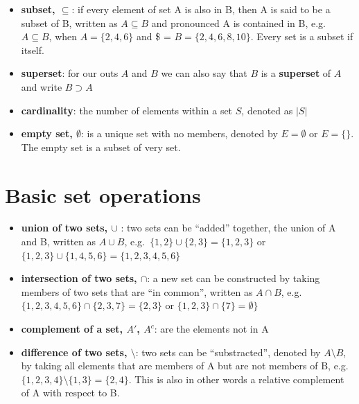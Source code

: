 \documentclass[
]{book}
\providecommand{\tightlist}{%
  \setlength{\itemsep}{0pt}\setlength{\parskip}{0pt}}
\theoremstyle{definition}
\theoremstyle{definition}
\theoremstyle{definition}
\theoremstyle{remark}
\begin{document}
\begin{itemize}
\tightlist
\item
  \textbf{subset, \(\subseteq\)}: if every element of set A is also in B, then A is said to be a subset of B, written as \(A \subseteq B\) and pronounced A is contained in B, e.g.~\(A \subseteq B\), when \(A = \{2, 4, 6\}\) and \$ = \(B = \{2, 4, 6, 8, 10\}\). Every set is a subset if itself.
\item
  \textbf{superset}: for our outs \(A\) and \(B\) we can also say that \(B\) is a \textbf{superset} of \(A\) and write \(B \supset A\)
\end{itemize}

\begin{itemize}
\tightlist
\item
  \textbf{cardinality}: the number of elements within a set \(S\), denoted as \(|S|\)
\item
  \textbf{empty set, \(\emptyset\)}: is a unique set with no members, denoted by \(E = \emptyset\) or \(E = \{\}\). The empty set is a subset of very set.
\end{itemize}

\hypertarget{basic-set-operations}{%
\section{Basic set operations}\label{basic-set-operations}}

\begin{itemize}
\tightlist
\item
  \textbf{union of two sets, \(\cup\) }: two sets can be ``added'' together, the union of A and B, written as \(A \cup B\), e.g.~\(\{1, 2\} \cup \{2, 3\} = \{1, 2, 3\}\) or \(\{1, 2, 3\} \cup \{1, 4, 5, 6\} = \{1, 2, 3, 4, 5, 6\}\)
\item
  \textbf{intersection of two sets, \(\cap\)}: a new set can be constructed by taking members of two sets that are ``in common'', written as \(A \cap B\), e.g.~\(\{1, 2, 3, 4, 5, 6\} \cap \{2, 3, 7\} = \{2, 3\}\) or \(\{1, 2, 3\} \cap \{7 \} = \emptyset \}\)
\end{itemize}

\begin{itemize}
\tightlist
\item
  \textbf{complement of a set, \(A'\), \(A^c\)}: are the elements not in A
\item
  \textbf{difference of two sets, \(\setminus\)}: two sets can be ``substracted'', denoted by \(A \setminus B\), by taking all elements that are members of A but are not members of B, e.g.~\(\{1, 2, 3, 4\} \setminus \{1, 3\} = \{2, 4\}\). This is also in other words a relative complement of A with respect to B.
\end{itemize}
\end{document}
